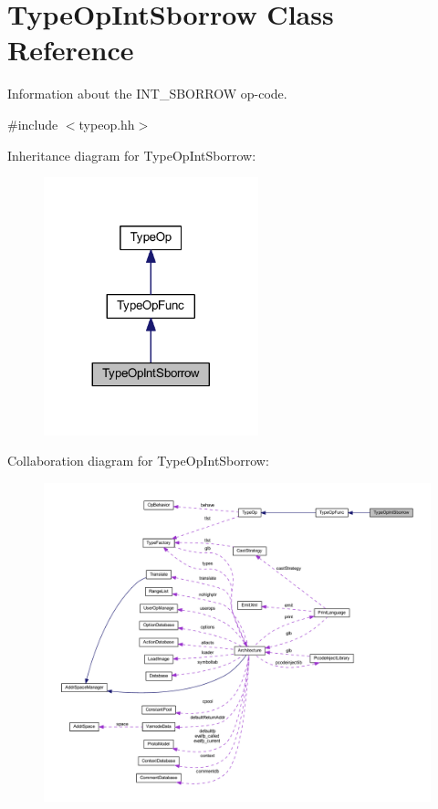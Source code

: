 \hypertarget{class_type_op_int_sborrow}{}\section{Type\+Op\+Int\+Sborrow Class Reference}
\label{class_type_op_int_sborrow}


Information about the I\+N\+T\+\_\+\+S\+B\+O\+R\+R\+OW op-\/code.  




{\ttfamily \#include $<$typeop.\+hh$>$}



Inheritance diagram for Type\+Op\+Int\+Sborrow\+:
\nopagebreak
\begin{figure}[H]
\begin{center}
\leavevmode
\includegraphics[width=176pt]{class_type_op_int_sborrow__inherit__graph}
\end{center}
\end{figure}


Collaboration diagram for Type\+Op\+Int\+Sborrow\+:
\nopagebreak
\begin{figure}[H]
\begin{center}
\leavevmode
\includegraphics[width=350pt]{class_type_op_int_sborrow__coll__graph}
\end{center}
\end{figure}
